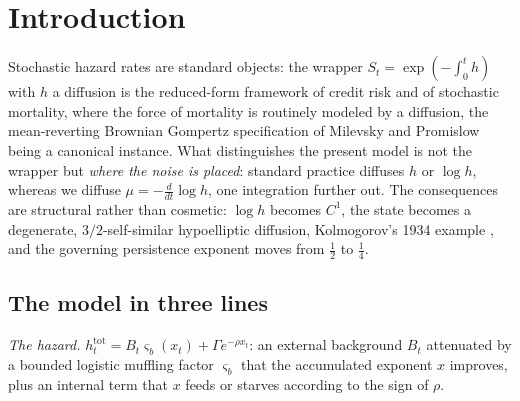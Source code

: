 \begin{abstract}
experiments with exact pair simulation support the $t^{-1/4}$ exponent
for the soft-killing functional, the boundedness (indeed apparent
convergence) of the soft-to-hard survival ratio, the gauge role of the
initial hazard, the finite-window kinematic factor $(1-s/t)^{-1/4}$,
self-similar convergence of the conditioned credit, and the
qualitative structure of the survivorship drift. One candidate empirical signature follows: under criticality the population hazard of survivors decays as $1/(4t)$. The signature does not by itself distinguish the model from static frailty, since a gamma frailty of shape $1/4$ reproduces the same asymptotic, so the contrast requires a specified competing model rather than a plateau alone; and the two-channel transfer beyond the bare soft-wall hypothesis is conjectural throughout.
\end{abstract}

\section{Introduction}\label{sec:intro}

Stochastic hazard rates are standard objects: the wrapper
$S_t=\exp(-\int_0^t h)$ with $h$ a diffusion is the reduced-form
framework of credit risk \cite{Lan04} and of stochastic mortality,
where the force of mortality is routinely modeled by a diffusion, the
mean-reverting Brownian Gompertz specification of Milevsky and
Promislow \cite{MP01} being a canonical instance. What distinguishes
the present model is not the wrapper but \emph{where the noise is
placed}: standard practice diffuses $h$ or $\log h$, whereas we diffuse
$\mu=-\tfrac{d}{dt}\log h$, one integration further out. The
consequences are structural rather than cosmetic: $\log h$ becomes
$C^1$, the state becomes a degenerate, $3/2$-self-similar hypoelliptic
diffusion, Kolmogorov's 1934 example \cite{Kol34,Hor67}, and the
governing persistence exponent moves from $\tfrac12$ to $\tfrac14$.

\subsection{The model in three lines}
\emph{The hazard.}
$h^{\mathrm{tot}}_t=B_t\varsigma_b(x_t)+\Gamma e^{-\rho x_t}$: an
external background $B_t$ attenuated by a bounded logistic muffling
factor $\varsigma_b$ that the accumulated exponent $x$ improves, plus
an internal term that $x$ feeds or starves according to the sign of
$\rho$.

